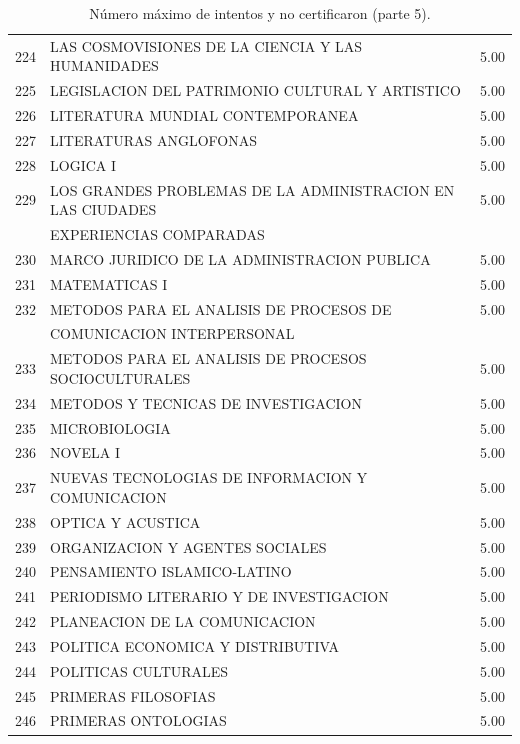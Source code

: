 \documentclass[12pt]{article}
\begin{document}
\begin{table}[ht]
{\begin{tabular}{rlr}
  224 & LAS COSMOVISIONES DE LA CIENCIA Y LAS HUMANIDADES & 5.00 \\ 
  225 & LEGISLACION DEL PATRIMONIO CULTURAL Y ARTISTICO & 5.00 \\ 
  226 & LITERATURA MUNDIAL CONTEMPORANEA & 5.00 \\ 
  227 & LITERATURAS ANGLOFONAS & 5.00 \\ 
  228 & LOGICA I & 5.00 \\ 
  229 & LOS GRANDES PROBLEMAS DE LA ADMINISTRACION EN LAS CIUDADES& 5.00 \\ 
 & EXPERIENCIAS COMPARADAS &  \\ 
  230 & MARCO JURIDICO DE LA ADMINISTRACION PUBLICA & 5.00 \\ 
  231 & MATEMATICAS I & 5.00 \\ 
  232 & METODOS PARA EL ANALISIS DE PROCESOS DE & 5.00 \\ 
  & COMUNICACION INTERPERSONAL & \\ 
  233 & METODOS PARA EL ANALISIS DE PROCESOS SOCIOCULTURALES & 5.00 \\ 
  234 & METODOS Y TECNICAS DE INVESTIGACION & 5.00 \\ 
  235 & MICROBIOLOGIA & 5.00 \\ 
  236 & NOVELA I & 5.00 \\ 
  237 & NUEVAS TECNOLOGIAS DE INFORMACION Y COMUNICACION & 5.00 \\ 
  238 & OPTICA Y ACUSTICA & 5.00 \\ 
  239 & ORGANIZACION Y AGENTES SOCIALES & 5.00 \\ 
  240 & PENSAMIENTO ISLAMICO-LATINO & 5.00 \\ 
  241 & PERIODISMO LITERARIO Y DE INVESTIGACION & 5.00 \\ 
  242 & PLANEACION DE LA COMUNICACION & 5.00 \\ 
  243 & POLITICA ECONOMICA Y DISTRIBUTIVA & 5.00 \\ 
  244 & POLITICAS CULTURALES & 5.00 \\ 
  245 & PRIMERAS FILOSOFIAS & 5.00 \\ 
  246 & PRIMERAS ONTOLOGIAS & 5.00 \\ 
  
   \hline
\end{tabular}
}\caption{\label{Num_Max_Intentos_Nunca_Cert_5} N\'umero m\'aximo de intentos y no certificaron (parte 5).}

\end{table}
\end{document}
